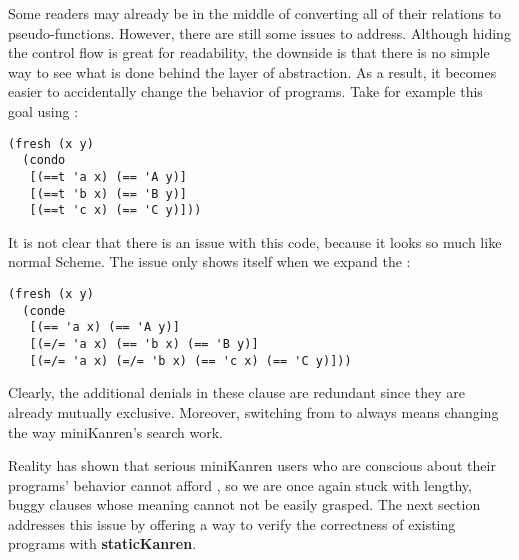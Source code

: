 Some readers may already be in the middle of converting all of their relations to pseudo-functions. However, there are still some issues to address. Although hiding the control flow is great for readability, the downside is that there is no simple way to see what is done behind the layer of abstraction. As a result, it becomes easier to accidentally change the behavior of programs. Take for example this goal using :
\begin{lstlisting}
(fresh (x y)
  (condo
   [(==t 'a x) (== 'A y)]
   [(==t 'b x) (== 'B y)]
   [(==t 'c x) (== 'C y)]))
\end{lstlisting}
It is not clear that there is an issue with this code, because it looks so much like normal Scheme. The issue only shows itself when we expand the :
\begin{lstlisting}
(fresh (x y)
  (conde
   [(== 'a x) (== 'A y)]
   [(=/= 'a x) (== 'b x) (== 'B y)]
   [(=/= 'a x) (=/= 'b x) (== 'c x) (== 'C y)]))
\end{lstlisting}
Clearly, the additional denials in these  clause are redundant since they are already mutually exclusive. Moreover, switching from  to  always means changing the way miniKanren's search work.

Reality has shown that serious miniKanren users who are conscious about their programs' behavior cannot afford , so we are once again stuck with lengthy, buggy  clauses whose meaning cannot not be easily grasped. The next section addresses this issue by offering a way to verify the correctness of existing programs with \textbf{staticKanren}.